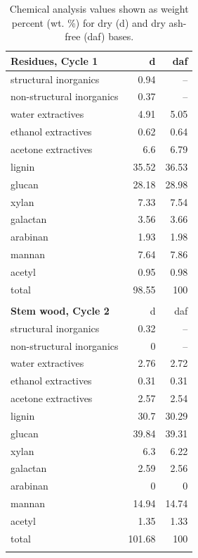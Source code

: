 \documentclass[12pt,titlepage]{article}
\begin{document}
\begin{longtable}{lrr}
    \caption{Chemical analysis values shown as weight percent (wt. \%) for dry (d) and dry ash-free (daf) bases.}
    \label{tab:chemical} \\

    \textbf{Residues, Cycle 1} & d & daf \\
    \midrule
    structural inorganics     & 0.94  & -- \\
    non-structural inorganics & 0.37  & -- \\
    water extractives         & 4.91  & 5.05 \\
    ethanol extractives       & 0.62  & 0.64 \\
    acetone extractives       & 6.6   & 6.79 \\
    lignin                    & 35.52 & 36.53 \\
    glucan                    & 28.18 & 28.98 \\
    xylan                     & 7.33  & 7.54 \\
    galactan                  & 3.56  & 3.66 \\
    arabinan                  & 1.93  & 1.98 \\
    mannan                    & 7.64  & 7.86 \\
    acetyl                    & 0.95  & 0.98 \\
    total                     & 98.55 & 100 \\
    \\

    \textbf{Stem wood, Cycle 2} & d & daf \\
    \midrule
    structural inorganics     & 0.32   & -- \\
    non-structural inorganics & 0      & -- \\
    water extractives         & 2.76   & 2.72 \\
    ethanol extractives       & 0.31   & 0.31 \\
    acetone extractives       & 2.57   & 2.54 \\
    lignin                    & 30.7   & 30.29 \\
    glucan                    & 39.84  & 39.31 \\
    xylan                     & 6.3    & 6.22 \\
    galactan                  & 2.59   & 2.56 \\
    arabinan                  & 0      & 0 \\
    mannan                    & 14.94  & 14.74 \\
    acetyl                    & 1.35   & 1.33 \\
    total                     & 101.68 & 100 \\
    \\


\end{longtable}
\end{document}
